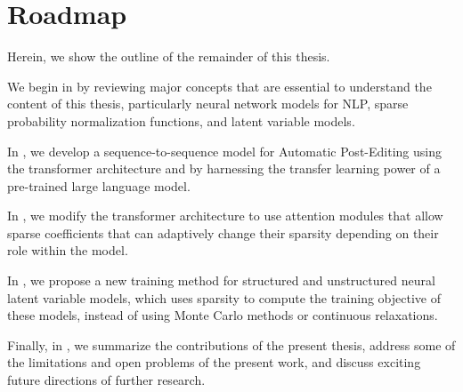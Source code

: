 \section{Roadmap}
\label{sec:int_roadmap}

\noindent Herein, we show the outline of the remainder of this thesis.

We begin in  by reviewing major concepts
that are essential to understand the content of this thesis,
particularly neural network models for NLP, sparse probability
normalization functions, and latent variable models.

In , we develop a sequence-to-sequence model for
Automatic Post-Editing using the transformer architecture and by
harnessing the transfer learning power of a pre-trained large
language model.

In , we modify the transformer architecture to use
attention modules that allow sparse coefficients that can adaptively
change their sparsity depending on their role within the model.

In , we propose a new training method for
structured and unstructured neural latent variable models, which uses
sparsity to compute the training objective of these
models, instead of using Monte Carlo methods or continuous relaxations.

Finally, in , we summarize the
contributions of the present thesis, address some of the limitations
and open problems of the present work, and discuss exciting future
directions of further research.
